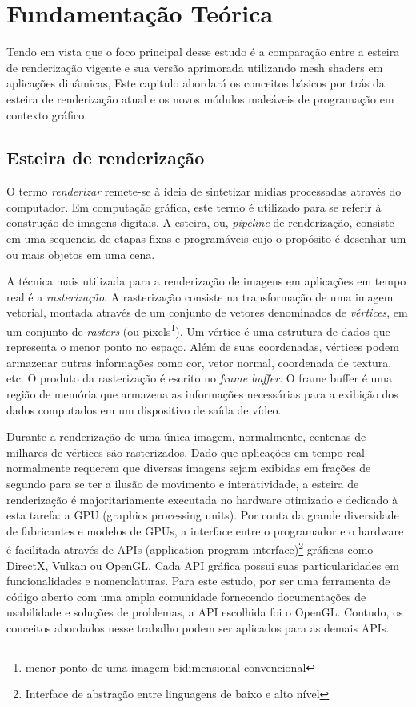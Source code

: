 \chapter{Fundamentação Teórica}\label{chp:LABEL_FUND_TEORICA}

Tendo em vista que o foco principal desse estudo é a comparação entre a esteira de renderização vigente e sua versão aprimorada utilizando mesh shaders em aplicações dinâmicas, Este capitulo abordará os conceitos básicos por trás da esteira de renderização atual e os novos módulos maleáveis de programação em contexto gráfico.

\section{Esteira de renderização}\label{sec:LABEL_CHP_1_SEC_PIPELINE_RENDERIZACAO}

O termo \textit{renderizar} remete-se à ideia de sintetizar mídias processadas através do computador. Em computação gráfica, este termo é utilizado para se referir à construção de imagens digitais. A esteira, ou, \textit{pipeline} de renderização, consiste em uma sequencia de etapas fixas e programáveis cujo o propósito é desenhar um ou mais objetos em uma cena.

A técnica mais utilizada para a renderização de imagens em aplicações em tempo real é a \textit{rasterização}. A rasterização consiste na transformação de uma imagem vetorial, montada através de um conjunto de vetores denominados de \textit{vértices}, em um conjunto de \textit{rasters} (ou pixels\footnote{menor ponto de uma imagem bidimensional convencional}). Um vértice é uma estrutura de dados que representa o menor ponto no espaço. Além de suas coordenadas, vértices podem armazenar outras informações como cor, vetor normal, coordenada de textura, etc. O produto da rasterização é escrito no \textit{frame buffer}. O frame buffer é uma região de memória que armazena as informações necessárias para a exibição dos dados computados em um dispositivo de saída de vídeo.

Durante a renderização de uma única imagem, normalmente, centenas de milhares de vértices são rasterizados. Dado que aplicações em tempo real normalmente requerem que diversas imagens sejam exibidas em frações de segundo para se ter a ilusão de movimento e interatividade, a esteira de renderização é majoritariamente executada no hardware otimizado e dedicado à esta tarefa: a GPU (graphics processing units). Por conta da grande diversidade de fabricantes e modelos de GPUs, a interface entre o programador e o hardware é facilitada através de APIs (application program interface)\footnote{Interface de abstração entre linguagens de baixo e alto nível} gráficas como DirectX, Vulkan ou OpenGL. Cada API gráfica possui suas particularidades em funcionalidades e nomenclaturas. Para este estudo, por ser uma ferramenta de código aberto com uma ampla comunidade fornecendo documentações de usabilidade e soluções de problemas, a API escolhida foi o OpenGL. Contudo, os conceitos abordados nesse trabalho podem ser aplicados para as demais APIs.

